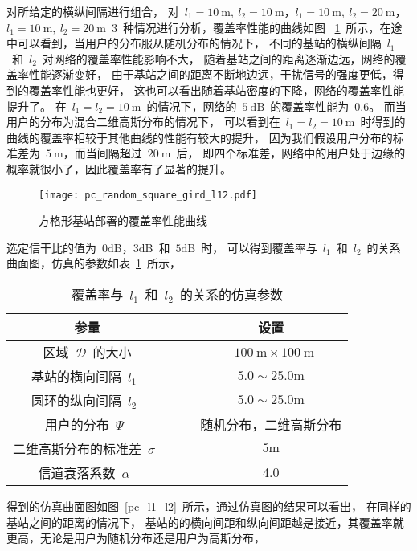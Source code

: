 对所给定的横纵间隔进行组合，
对~$l_1=10~\mathrm{m},~l_2=10~\mathrm{m}$，$l_1=10~\mathrm{m},~l_2=20~\mathrm{m}$，
$l_1=10~\mathrm{m},~l_2=20~\mathrm{m}$~3~种情况进行分析，覆盖率性能的曲线如图
~\ref{pc_random_square_gird_l12}~所示，在途中可以看到，当用户的分布服从随机分布的情况下，
不同的基站的横纵间隔~$l_1$~和~$l_2$~对网络的覆盖率性能影响不大，
随着基站之间的距离逐渐边远，网络的覆盖率性能逐渐变好，
由于基站之间的距离不断地边远，干扰信号的强度更低，得到的覆盖率性能也更好，
这也可以看出随着基站密度的下降，网络的覆盖率性能提升了。
在~$l_1=l_2=10~\mathrm{m}$~的情况下，网络的~$5~\mathrm{dB}$~的覆盖率性能为~0.6。
而当用户的分布为混合二维高斯分布的情况下，
可以看到在~$l_1=l_2=10~\mathrm{m}$~时得到的曲线的覆盖率相较于其他曲线的性能有较大的提升，
因为我们假设用户分布的标准差为~$5~\mathrm{m}$，而当间隔超过~$20~\mathrm{m}$~后，
即四个标准差，网络中的用户处于边缘的概率就很小了，因此覆盖率有了显著的提升。
\begin{figure}[htbp]
\centering
\texttt{[image: pc\_random\_square\_gird\_l12.pdf]}
\caption{方格形基站部署的覆盖率性能曲线}\vspace{-0.5em}
\label{pc_random_square_gird_l12}
\end{figure}
选定信干比的值为~$0\mathrm{dB}$，$3\mathrm{dB}$~和~$5\mathrm{dB}$~时，
可以得到覆盖率与~$l_1$~和~$l_2$~的关系曲面图，仿真的参数如表~\ref{square_grid_pc_para}~所示，
\begin{table}[htbp]
\caption{覆盖率与~$l_1$~和~$l_2$~的关系的仿真参数}
\label{square_grid_pc_para}
\vspace{0.5em}\centering\wuhao
\begin{tabular}{cccc}
\toprule[1.5pt]
参量 & & & 设置 \\
\midrule[0.5pt]
区域~$\mathcal{D}$~的大小  & & & ~$100~\mathrm{m} \times 100~ \mathrm{m}$ \\
基站的横向间隔~$l_1$~ & & &  $5.0\sim 25.0\mathrm{m}$\\
圆环的纵向间隔~$l_2$~ & & &  $5.0\sim 25.0\mathrm{m}$\\
用户的分布~$\Psi$~ & & & 随机分布，二维高斯分布\\
二维高斯分布的标准差~$\sigma$~ & & & ${5\mathrm{m}}$\\
信道衰落系数~$\alpha$~  & & & 4.0\\
\bottomrule[1.5pt]
\end{tabular}
\end{table}
得到的仿真曲面图如图~\ref{pc_l1_l2}~所示，通过仿真图的结果可以看出，
在同样的基站之间的距离的情况下，
基站的的横向间距和纵向间距越是接近，其覆盖率就更高，无论是用户为随机分布还是用户为高斯分布，
